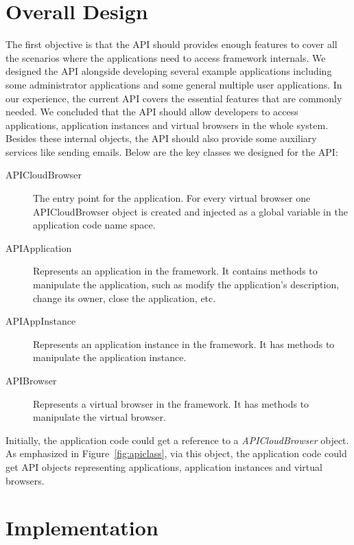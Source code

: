 \section{Overall Design}

The first objective is that the API should provides enough features to cover
all the scenarios where the applications need to access framework internals.
We designed the API alongside developing several example applications
including some administrator applications and some general multiple user
applications. In our experience, the current API covers the essential features
that are commonly needed. We concluded that the API should allow developers to
access applications, application instances and virtual browsers in the whole
system. Besides these internal objects, the API should also provide some
auxiliary services like sending emails. Below are the key classes we designed
for the API:

\begin{description}
\item[APICloudBrowser]
The entry point for the application.
For every virtual browser one APICloudBrowser object is created and injected as
a global variable in the application code name space.

\item[APIApplication] Represents an application in the framework.
It contains methods to manipulate the application, such as modify the application's
description, change its owner, close the application, etc.

\item[APIAppInstance] Represents an application instance in the framework.
It has methods to manipulate the application instance.

\item[APIBrowser] Represents a virtual browser in the framework.
It has methods to manipulate the virtual browser.

\end{description}

\apiclassfig{}

Initially, the application code could get a reference to a
\emph{APICloudBrowser} object. As emphasized in Figure~\ref{fig:apiclass}, via
this object, the application code could get API objects representing
applications, application instances and virtual browsers.


\section{Implementation}

